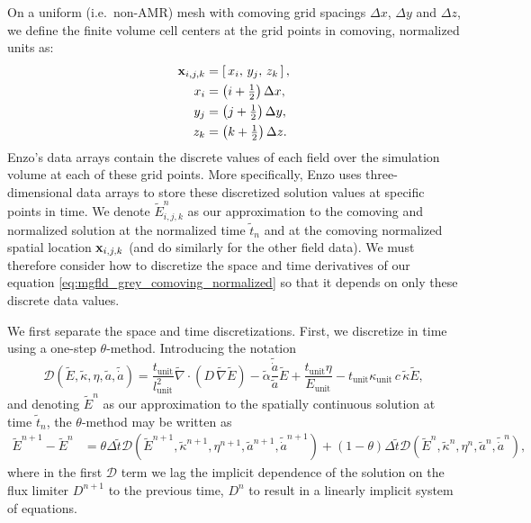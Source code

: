 \documentclass[10pt]{article}
\renewcommand{\(}{\left(}
\renewcommand{\)}{\right)}
\newcommand{\xvec}{{\bf x}}
\newcommand{\adot}{\dot{a}}
\newcommand{\mD}{{\mathcal D}}
\newcommand{\Lunit}{l_{\text{unit}}}
\newcommand{\Tunit}{t_{\text{unit}}}
\newcommand{\Eunit}{E_{\text{unit}}}
\newcommand{\Kunit}{\kappa_{\text{unit}}}
\newcommand{\tK}{\tilde{\kappa}}
\newcommand{\tT}{\tilde{t}}
\newcommand{\tE}{\tilde{E}}
\newcommand{\tA}{\tilde{a}}
\newcommand{\tAdot}{\tilde{\adot}}
\newcommand{\talpha}{\tilde{\alpha}}
\newcommand{\tnabla}{\tilde{\nabla}}
\begin{document}
On a uniform (i.e.~non-AMR) mesh with comoving grid spacings $\Delta x$,
$\Delta y$ and $\Delta z$, we define the finite volume cell centers at
the grid points in comoving, normalized units as:
\begin{align*}
   \xvec_{i,j,k} &= \left[\,x_i,\,  y_j,\, z_k\,\right], \\
   x_i &= \left(i + \tfrac12\right) \Delta x, \\
   y_j &= \left(j + \tfrac12\right) \Delta y, \\
   z_k &= \left(k + \tfrac12\right) \Delta z.
\end{align*}
Enzo's data arrays contain the discrete values of each field over the
simulation volume at each of these grid points.  More specifically,
Enzo uses three-dimensional data arrays to store these discretized
solution values at specific points in time.  We denote $\tE^n_{i,j,k}$
as our approximation to the comoving and normalized solution at the
normalized time $\tT_{n}$ and at the comoving normalized spatial
location $\xvec_{i,j,k}$ (and do similarly for the other field data).
We must therefore consider how to discretize the space and time
derivatives of our equation \eqref{eq:mgfld_grey_comoving_normalized}
so that it depends on only these discrete data values.

We first separate the space and time discretizations.  First, we
discretize in time using a one-step $\theta$-method.  Introducing the
notation
\[
   \mD(\tE,\tK,\eta,\tA,\tAdot) = 
   \frac{\Tunit}{\Lunit^2}\tnabla\cdot\(D\,\tnabla \tE\)
    - \talpha\frac{\tAdot}{\tA} \tE 
    + \frac{\Tunit\eta}{\Eunit} 
    - \Tunit \Kunit\, c\, \tK \tE,
\]
and denoting $\tE^n$ as our approximation to the spatially continuous
solution at time $\tT_{n}$, the $\theta$-method may be written as
\begin{align}
  \label{eq:mgfld_theta}
  \tE^{n+1} - \tE^n &= 
    \theta\Delta \tT \mD(\tE^{n+1},\tK^{n+1},\eta^{n+1},\tA^{n+1},\tAdot^{n+1}) 
    + (1-\theta)\Delta \tT \mD(\tE^n,\tK^n,\eta^n,\tA^n,\tAdot^n),
\end{align}
where in the first $\mD$ term we lag the implicit dependence of the
solution on the flux limiter $D^{n+1}$ to the previous time, $D^n$ to
result in a linearly implicit system of equations.  
\end{document}
